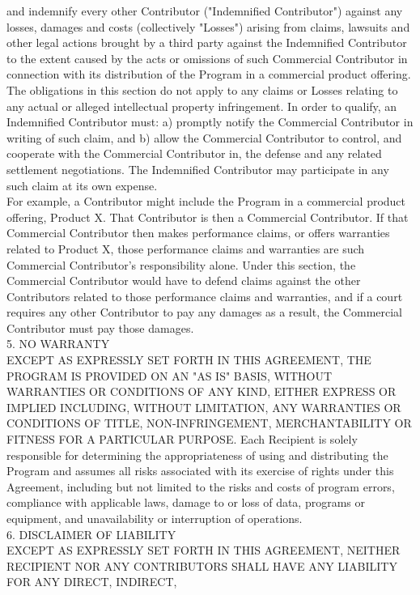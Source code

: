 {and indemnify every other Contributor ("Indemnified Contributor")
against any losses, damages and costs (collectively "Losses") arising
from claims, lawsuits and other legal actions brought by a third party
against the Indemnified Contributor to the extent caused by the acts
or omissions of such Commercial Contributor in connection with its
distribution of the Program in a commercial product offering. The
obligations in this section do not apply to any claims or Losses
relating to any actual or alleged intellectual property
infringement. In order to qualify, an Indemnified Contributor must: a)
promptly notify the Commercial Contributor in writing of such claim,
and b) allow the Commercial Contributor to control, and cooperate with
the Commercial Contributor in, the defense and any related settlement
negotiations. The Indemnified Contributor may participate in any such
claim at its own expense.
\\[4pt]
For example, a Contributor might include the Program in a commercial
product offering, Product X. That Contributor is then a Commercial
Contributor. If that Commercial Contributor then makes performance
claims, or offers warranties related to Product X, those performance
claims and warranties are such Commercial Contributor's responsibility
alone. Under this section, the Commercial Contributor would have to
defend claims against the other Contributors related to those
performance claims and warranties, and if a court requires any other
Contributor to pay any damages as a result, the Commercial Contributor
must pay those damages.
\\[4pt]
5. NO WARRANTY
\\[4pt]
EXCEPT AS EXPRESSLY SET FORTH IN THIS AGREEMENT, THE PROGRAM IS
PROVIDED ON AN "AS IS" BASIS, WITHOUT WARRANTIES OR CONDITIONS OF ANY
KIND, EITHER EXPRESS OR IMPLIED INCLUDING, WITHOUT LIMITATION, ANY
WARRANTIES OR CONDITIONS OF TITLE, NON-INFRINGEMENT, MERCHANTABILITY
OR FITNESS FOR A PARTICULAR PURPOSE. Each Recipient is solely
responsible for determining the appropriateness of using and
distributing the Program and assumes all risks associated with its
exercise of rights under this Agreement, including but not limited to
the risks and costs of program errors, compliance with applicable
laws, damage to or loss of data, programs or equipment, and
unavailability or interruption of operations.
\\[4pt]
6. DISCLAIMER OF LIABILITY
\\[4pt]
EXCEPT AS EXPRESSLY SET FORTH IN THIS AGREEMENT, NEITHER RECIPIENT NOR
ANY CONTRIBUTORS SHALL HAVE ANY LIABILITY FOR ANY DIRECT, INDIRECT,
}
